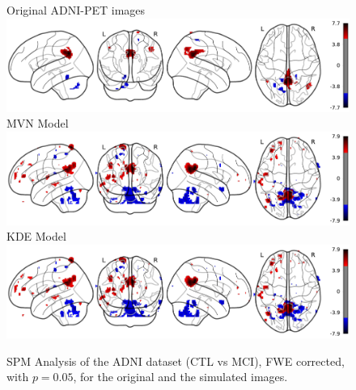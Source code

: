 \begin{figure}
	\centering
	Original ADNI-PET images\\
	\includegraphics[width=\linewidth]{Graphics/ch8/NORvsMCI_Orig_glass}\\
	\ac{MVN} Model\\
	\includegraphics[width=\linewidth]{Graphics/ch8/NORvsMCI_MVN_glass}\\
	\ac{KDE} Model\\
	\includegraphics[width=\linewidth]{Graphics/ch8/NORvsMCI_KDE_glass}
	\caption[\acs{SPM} Analysis of the ADNI dataset (\acs{CTL} vs \acs{MCI}).]{\ac{SPM} Analysis of the ADNI dataset (\ac{CTL} vs \ac{MCI}), \ac{FWE} corrected, with $p=0.05$, for the original and the simulated images.}
	\label{fig:spmNORvsMCI}
\end{figure}


